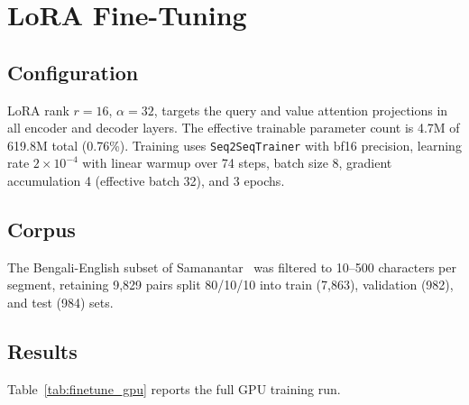 \documentclass[journal]{IEEEtran}
\begin{document}
\section{LoRA Fine-Tuning}
\label{sec:finetune}

\subsection{Configuration}

LoRA rank $r=16$, $\alpha=32$, targets the query and value attention projections
in all encoder and decoder layers.
The effective trainable parameter count is 4.7M of 619.8M total (0.76\%).
Training uses \texttt{Seq2SeqTrainer} with bf16 precision, learning rate
$2\times10^{-4}$ with linear warmup over 74 steps, batch size 8,
gradient accumulation 4 (effective batch 32), and 3 epochs.

\subsection{Corpus}

The Bengali-English subset of Samanantar~\cite{samanantar2022} was filtered to
10--500 characters per segment, retaining 9,829 pairs split 80/10/10 into
train (7,863), validation (982), and test (984) sets.

\subsection{Results}

Table~\ref{tab:finetune_gpu} reports the full GPU training run.
\end{document}

